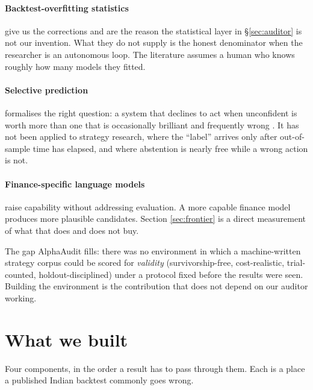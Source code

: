 \documentclass[11pt,a4paper]{article}
\begin{document}
\paragraph{Backtest-overfitting statistics} give us the corrections
\citep{bailey2014,bailey2017,harvey2016,lopezdeprado2018} and are the reason the statistical layer
in \S\ref{sec:auditor} is not our invention. What they do not supply is the honest denominator
when the researcher is an autonomous loop. The literature assumes a human who knows roughly how
many models they fitted.

\paragraph{Selective prediction} formalises the right question: a system that declines to act
when unconfident is worth more than one that is occasionally brilliant and frequently wrong
\citep{elyaniv2010,geifman2017}. It has not been applied to strategy research, where the
``label'' arrives only after out-of-sample time has elapsed, and where abstention is nearly free
while a wrong action is not.

\paragraph{Finance-specific language models} \citep{wu2023} raise capability without addressing
evaluation. A more capable finance model produces more plausible candidates. Section
\ref{sec:frontier} is a direct measurement of what that does and does not buy.

\begin{finding}
The gap AlphaAudit fills: there was no environment in which a machine-written strategy corpus
could be scored for \emph{validity} (survivorship-free, cost-realistic, trial-counted,
holdout-disciplined) under a protocol fixed before the results were seen. Building the
environment is the contribution that does not depend on our auditor working.
\end{finding}

\section{What we built}
\label{sec:infra}

Four components, in the order a result has to pass through them. Each is a place a published
Indian backtest commonly goes wrong.
\end{document}
